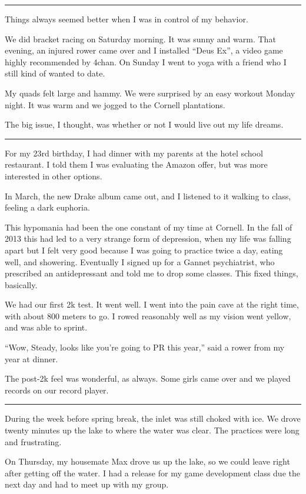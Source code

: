\plainfancybreak{12pt}{2}{* * *}

Things always seemed better when I was in control of my behavior.

We did bracket racing on Saturday morning.  It was sunny and warm.  That
evening, an injured rower came over and I installed ``Deus Ex'', a video game
highly recommended by 4chan.   On Sunday I went to yoga with a friend who I
still kind of wanted to date.

My quads felt large and hammy.  We were surprised by an easy workout Monday
night.  It was warm and we jogged to the Cornell plantations.

The big issue, I thought, was whether or not I would live out my life dreams.

\plainfancybreak{12pt}{2}{* * *}

For my 23rd birthday, I had dinner with my parents at the hotel school
restaurant.  I told them I was evaluating the Amazon offer, but was more
interested in other options.

In March, the new Drake album came out, and I listened to it walking
to class, feeling a dark euphoria.

This hypomania had been the one constant of my time at Cornell.  In the fall of
2013 this had led to a very strange form of depression, when my life was falling
apart but I felt very good because I was going to practice twice a day, eating
well, and showering.  Eventually I signed up for a Gannet psychiatrist, who
prescribed an antidepressant and told me to drop some classes.  This fixed
things, basically. 

We had our first 2k test.  It went well.  I went into the pain cave at the right
time, with about 800 meters to go.  I rowed reasonably well as my vision went
yellow, and was able to sprint.  

``Wow, Steady, looks like you're going to PR this year,'' said a rower from my
year at dinner.  

The post-2k feel was wonderful, as always.  Some girls came over and we played
records on our record player.  

\plainfancybreak{12pt}{2}{* * *}

During the week before spring break, the inlet was still choked with ice. We
drove twenty minutes up the lake to where the water was clear.  The practices
were long and frustrating.

On Thursday, my housemate Max drove us up the lake, so we could leave right
after getting off the water.  I had a release for my game development class due
the next day and had to meet up with my group.

